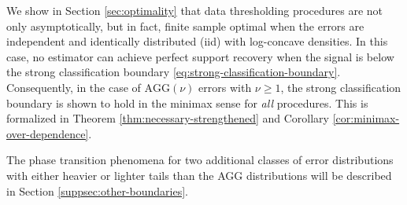 

\medskip

We show in Section \ref{sec:optimality} that data thresholding procedures are not only asymptotically, but in fact, finite sample optimal when the errors are independent and identically distributed (iid) with log-concave densities. 
In this case, no estimator can achieve perfect support recovery when the signal is below the strong classification boundary \eqref{eq:strong-classification-boundary}.  
Consequently, in the case of $\text{AGG}(\nu)$ errors with $\nu\ge 1$, the strong 
classification boundary is shown to hold in the minimax 
sense for \emph{all} procedures. This is formalized in Theorem \ref{thm:necessary-strengthened} and Corollary \ref{cor:minimax-over-dependence}. 

\medskip

The phase transition phenomena for two additional classes of error distributions with either heavier or lighter tails than the AGG distributions will be described in Section \ref{suppsec:other-boundaries}.

